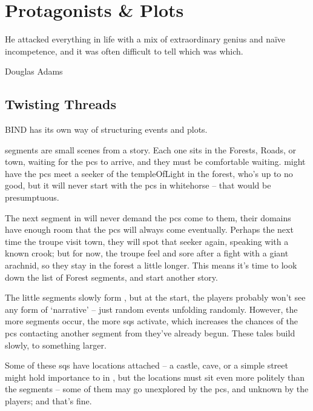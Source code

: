 \chapter{Protagonists \& Plots}
  \epigraph{He attacked everything in life with a mix of extraordinary genius and na\"ive incompetence, and it was often difficult to tell which was which.}{Douglas Adams}
\label{sideQuestIntro}

\section{Twisting Threads}
\label{sqSummaries}

\begin{multicols}{2}

\noindent
BIND has its own way of structuring events and plots.

\Glspl{segment} are small scenes from a story.
Each one sits in the Forests, Roads, or \gls{town}, waiting for the \glspl{pc} to arrive, and they must be comfortable waiting.
 might have the \glspl{pc} meet a \gls{seeker} of the \gls{templeOfLight} in the forest, who's up to no good, but it will never start with the \glspl{pc} in \gls{whitehorse} -- that would be presumptuous.

The next \gls{segment} in  will never demand the \glspl{pc} come to them, their domains have enough room that the \glspl{pc} will always come eventually.
Perhaps the next time the troupe visit town, they will spot that \gls{seeker} again, speaking with a known crook; but for now, the troupe feel and sore after a fight with a giant arachnid, so they stay in the forest a little longer.
This means it's time to look down the list of Forest \glspl{segment}, and start another story.

The little \glspl{segment} slowly form , but at the start, the players probably won't see any form of `narrative' -- just random events unfolding randomly.
However, the more \glspl{segment} occur, the more \glspl{sq} activate, which increases the chances of the \glspl{pc} contacting another \gls{segment} from  they've already begun.
These tales build slowly, to something larger.

Some of these \glspl{sq} have locations attached -- a castle, cave, or a simple street might hold importance to  in , but the locations must sit even more politely than the \glspl{segment} -- some of them may go unexplored by the \glspl{pc}, and unknown by the players; and that's fine.


\end{multicols}
